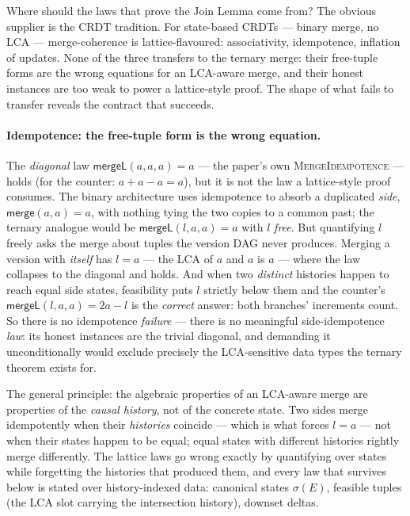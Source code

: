 \documentclass[11pt]{article}
\newcommand{\Merge}{\mathsf{merge}}
\newcommand{\mergeL}{\mathsf{mergeL}}
\begin{document}
Where should the laws that prove the Join Lemma come from? The obvious
supplier is the CRDT tradition. For state-based CRDTs --- binary merge,
no LCA --- merge-coherence is lattice-flavoured: associativity,
idempotence, inflation of updates. None of the three transfers to the
ternary merge: their free-tuple forms are the wrong equations for an
LCA-aware merge, and their honest instances are too weak to power a
lattice-style proof. The shape of what fails to transfer reveals the
contract that succeeds.

\paragraph{Idempotence: the free-tuple form is the wrong equation.}
The \emph{diagonal} law $\mergeL(a,a,a) = a$ --- the paper's own
\textsc{MergeIdempotence} --- holds (for the counter: $a + a - a = a$),
but it is not the law a lattice-style proof consumes. The binary
architecture uses idempotence to absorb a duplicated \emph{side},
$\Merge(a,a) = a$, with nothing tying the two copies to a common past;
the ternary analogue would be $\mergeL(l,a,a) = a$ with $l$ \emph{free}.
But quantifying $l$ freely asks the merge about tuples the version DAG
never produces. Merging a version with \emph{itself} has $l = a$ --- the
LCA of $a$ and $a$ is $a$ --- where the law collapses to the diagonal
and holds. And when two \emph{distinct} histories happen to reach equal
side states, feasibility puts $l$ strictly below them and the counter's
$\mergeL(l,a,a) = 2a - l$ is the \emph{correct} answer: both branches'
increments count. So there is no idempotence \emph{failure} --- there is
no meaningful side-idempotence \emph{law}: its honest instances are the
trivial diagonal, and demanding it unconditionally would exclude
precisely the LCA-sensitive data types the ternary theorem exists for.

The general principle: the algebraic properties of an LCA-aware merge
are properties of the \emph{causal history}, not of the concrete state. Two sides merge
idempotently when their \emph{histories} coincide --- which is what
forces $l = a$ --- not when their states happen to be equal; equal
states with different histories rightly merge differently. The lattice
laws go wrong exactly by quantifying over states while forgetting the
histories that produced them, and every law that survives below is
stated over history-indexed data: canonical states $\sigma(E)$, feasible
tuples (the LCA slot carrying the intersection history), downset deltas.
\end{document}
